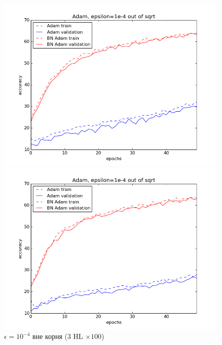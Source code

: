 \documentclass[12pt,oneside]{article}
\begin{document}
\begin{figure}[h!]
\centering
\begin{minipage}{0.45\textwidth}
\includegraphics[scale=0.45]{images/clAdam2.png}
\end{minipage} \hfill
\begin{minipage}{0.45\textwidth}
\includegraphics[scale=0.45]{images/clAdam2_s10.png}
\end{minipage}
\caption{\small $\epsilon = 10^{-4}$ вне корня ($3$ HL $\times 100$)}
\end{figure}
\end{document}
